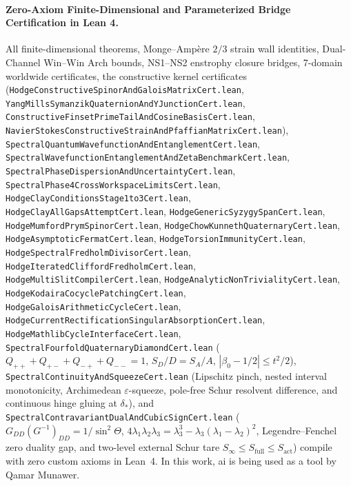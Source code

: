 \documentclass[11pt,a4paper]{article}
\begin{document}
\paragraph{Zero-Axiom Finite-Dimensional and Parameterized Bridge Certification in Lean 4.}
All finite-dimensional theorems, Monge--Amp\`ere $2/3$ strain wall identities, Dual-Channel Win--Win Arch bounds, NS1--NS2 enstrophy closure bridges, 7-domain worldwide certificates, the constructive kernel certificates (\texttt{HodgeConstructiveSpinorAndGaloisMatrixCert.lean}, \texttt{YangMillsSymanzikQuaternionAndYJunctionCert.lean}, \texttt{ConstructiveFinsetPrimeTailAndCosineBasisCert.lean}, \texttt{NavierStokesConstructiveStrainAndPfaffianMatrixCert.lean}), \texttt{SpectralQuantumWavefunctionAndEntanglementCert.lean}, \texttt{SpectralWavefunctionEntanglementAndZetaBenchmarkCert.lean}, \texttt{SpectralPhaseDispersionAndUncertaintyCert.lean}, \texttt{SpectralPhase4CrossWorkspaceLimitsCert.lean}, \texttt{HodgeClayConditionsStage1to3Cert.lean}, \texttt{HodgeClayAllGapsAttemptCert.lean}, \texttt{HodgeGenericSyzygySpanCert.lean}, \texttt{HodgeMumfordPrymSpinorCert.lean}, \texttt{HodgeChowKunnethQuaternaryCert.lean}, \texttt{HodgeAsymptoticFermatCert.lean}, \texttt{HodgeTorsionImmunityCert.lean}, \texttt{HodgeSpectralFredholmDivisorCert.lean}, \texttt{HodgeIteratedCliffordFredholmCert.lean}, \texttt{HodgeMultiSlitCompilerCert.lean}, \texttt{HodgeAnalyticNonTrivialityCert.lean}, \texttt{HodgeKodairaCocyclePatchingCert.lean}, \texttt{HodgeGaloisArithmeticCycleCert.lean}, \texttt{HodgeCurrentRectificationSingularAbsorptionCert.lean}, \texttt{HodgeMathlibCycleInterfaceCert.lean}, \texttt{SpectralFourfoldQuaternaryDiamondCert.lean} ($Q_{++} + Q_{+-} + Q_{-+} + Q_{--} = 1$, $S_D/D = S_A/A$, $|\beta_0 - 1/2| \le t^2/2$), \texttt{SpectralContinuityAndSqueezeCert.lean} (Lipschitz pinch, nested interval monotonicity, Archimedean $\varepsilon$-squeeze, pole-free Schur resolvent difference, and continuous hinge gluing at $\delta_*$), and \texttt{SpectralContravariantDualAndCubicSignCert.lean} ($G_{DD}(G^{-1})_{DD} = 1/\sin^2\Theta$, $4\lambda_1\lambda_2\lambda_3 = \lambda_3^3 - \lambda_3(\lambda_1-\lambda_2)^2$, Legendre--Fenchel zero duality gap, and two-level external Schur tare $S_\infty \le S_{\mathrm{full}} \le S_{\mathrm{act}}$) compile with zero custom axioms in Lean~4. In this work, ai is being used as a tool by Qamar Munawer.
\end{document}
